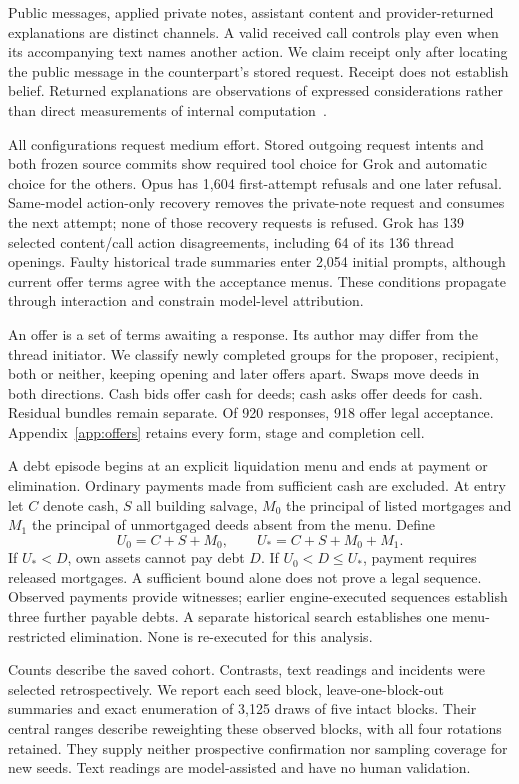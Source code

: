 \documentclass[11pt,letterpaper]{article}
\begin{document}
Public messages, applied private notes, assistant content and provider-returned explanations are distinct channels. A valid received call controls play even when its accompanying text names another action. We claim receipt only after locating the public message in the counterpart's stored request. Receipt does not establish belief. Returned explanations are observations of expressed considerations rather than direct measurements of internal computation~\cite{turpin,lanham}.

All configurations request medium effort. Stored outgoing request intents and both frozen source commits show required tool choice for Grok and automatic choice for the others. Opus has 1,604 first-attempt refusals and one later refusal. Same-model action-only recovery removes the private-note request and consumes the next attempt; none of those recovery requests is refused. Grok has 139 selected content/call action disagreements, including 64 of its 136 thread openings. Faulty historical trade summaries enter 2,054 initial prompts, although current offer terms agree with the acceptance menus. These conditions propagate through interaction and constrain model-level attribution.

An offer is a set of terms awaiting a response. Its author may differ from the thread initiator. We classify newly completed groups for the proposer, recipient, both or neither, keeping opening and later offers apart. Swaps move deeds in both directions. Cash bids offer cash for deeds; cash asks offer deeds for cash. Residual bundles remain separate. Of 920 responses, 918 offer legal acceptance. Appendix~\ref{app:offers} retains every form, stage and completion cell.

A debt episode begins at an explicit liquidation menu and ends at payment or elimination. Ordinary payments made from sufficient cash are excluded. At entry let $C$ denote cash, $S$ all building salvage, $M_0$ the principal of listed mortgages and $M_1$ the principal of unmortgaged deeds absent from the menu. Define
\[
 U_0=C+S+M_0,\qquad U_*=C+S+M_0+M_1.
\]
If $U_*<D$, own assets cannot pay debt $D$. If $U_0<D\le U_*$, payment requires released mortgages. A sufficient bound alone does not prove a legal sequence. Observed payments provide witnesses; earlier engine-executed sequences establish three further payable debts. A separate historical search establishes one menu-restricted elimination. None is re-executed for this analysis.

Counts describe the saved cohort. Contrasts, text readings and incidents were selected retrospectively. We report each seed block, leave-one-block-out summaries and exact enumeration of 3,125 draws of five intact blocks. Their central ranges describe reweighting these observed blocks, with all four rotations retained. They supply neither prospective confirmation nor sampling coverage for new seeds. Text readings are model-assisted and have no human validation.
\end{document}
